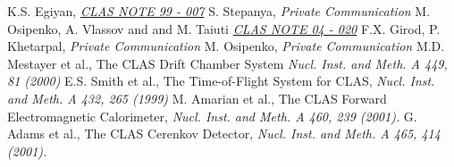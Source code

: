 \begin{thebibliography}{mybib}
        {K.S. Egiyan}, \href{http://www.jlab.org/Hall-B/notes/clas_notes99/ec_thresh.ps}{\it CLAS NOTE 99 - 007}
     {S. Stepanya}, {\it Private Communication}
      {M. Osipenko, A. Vlassov and and M. Taiuti } \href{http://www1.jlab.org/ul/Physics/Hall-B/clas/public/2004-020.pdf}{\it CLAS NOTE 04 - 020}
     {F.X. Girod, P. Khetarpal}, {\it Private Communication}
       {M. Osipenko}, {\it Private Communication}
           {M.D. Mestayer et al.}, The CLAS Drift Chamber System {\it Nucl. Inst. and Meth. A 449, 81 (2000)}
         {E.S. Smith et al.}, The Time-of-Flight System for CLAS, {\it Nucl. Inst. and Meth. A 432, 265 (1999)}
           {M. Amarian et al.}, The CLAS Forward Electromagnetic Calorimeter, {\it Nucl. Inst. and Meth. A 460, 239 (2001).}
           {G. Adams et al.}, The CLAS Cerenkov Detector, {\it Nucl. Inst. and Meth. A 465, 414 (2001).}
\end{thebibliography}
